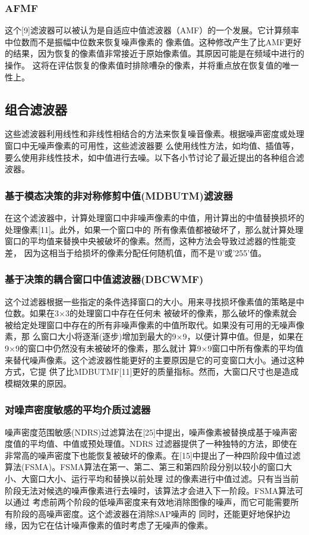 \documentclass[12pt]{article} %
\begin{document}
\subsubsection{AFMF}
这个[9]滤波器可以被认为是自适应中值滤波器（AMF）的一个发展。它计算频率中位数而不是振幅中位数来恢复噪声像素的
像素值。这种修改产生了比AMF更好的结果，因为恢复的像素值非常接近于原始像素值。其原因可能是在频域中进行的操作。
这将在评估恢复的像素值时排除嘈杂的像素，并将重点放在恢复值的唯一性上。

\subsection{组合滤波器}
这些滤波器利用线性和非线性相结合的方法来恢复噪音像素。根据噪声密度或处理窗口中无噪声像素的可用性，这些滤波器要
么使用线性方法，如均值、插值等，要么使用非线性技术，如中值进行去噪。以下各小节讨论了最近提出的各种组合滤波器。

\subsubsection{基于模态决策的非对称修剪中值(MDBUTM)滤波器}
在这个滤波器中，计算处理窗口中非噪声像素的中值，用计算出的中值替换损坏的处理像素[11]。此外，如果一个窗口中的
所有像素值都被破坏了，那么就计算处理窗口的平均值来替换中央被破坏的像素。然而，这种方法会导致过滤器的性能变差，
因为这相当于给损坏的像素分配任何随机值，而不是'0'或'255'值。

\subsubsection{基于决策的耦合窗口中值滤波器(DBCWMF)}
这个过滤器根据一些指定的条件选择窗口的大小。用来寻找损坏像素值的策略是中位数。如果在3×3的处理窗口中存在任何未
被破坏的像素，那么破坏的像素就会被给定处理窗口中存在的所有非噪声像素的中值所取代。如果没有可用的无噪声像素，那
么窗口大小将逐渐(逐步)增加到最大的9×9，以便计算中值。但是，如果在9×9的窗口中仍然没有未被破坏的像素，那么就计
算9×9窗口中所有像素的平均值来替代噪声像素。这个滤波器性能更好的主要原因是它的可变窗口大小。通过这种方式，它提
供了比MDBUTMF[11]更好的质量指标。然而，大窗口尺寸也是造成模糊效果的原因。

\subsubsection{对噪声密度敏感的平均介质过滤器}
噪声密度范围敏感(NDRS)过滤算法在[25]中提出，噪声像素被替换成基于噪声密度值的平均值、中值或预处理值。NDRS
过滤器提供了一种独特的方法，即使在非常高的噪声密度下也能恢复被破坏的像素。在[15]中提出了一种四阶段中值过滤
算法(FSMA)。FSMA算法在第一、第二、第三和第四阶段分别以较小的窗口大小、大窗口大小、运行平均和替换以前处理
过的像素进行中值过滤。只有当当前阶段无法对候选的噪声像素进行去噪时，该算法才会进入下一阶段。FSMA算法可以通过
考虑前两个阶段的低噪声密度来有效地消除图像的噪声，而它可能需要所有阶段的高噪声密度。这个滤波器在消除SAP噪声的
同时，还能更好地保护边缘，因为它在估计噪声像素的值时考虑了无噪声的像素。
\end{document}
